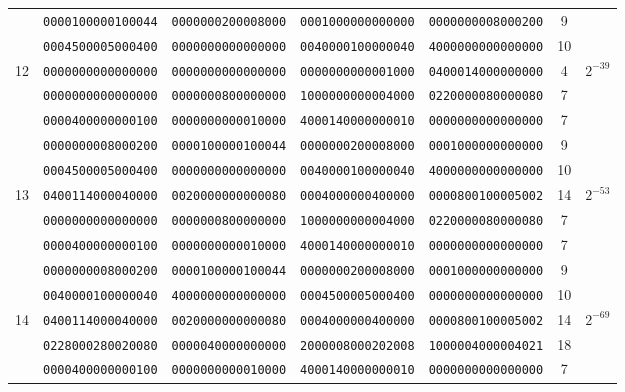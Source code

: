\begin{table}[!tb]
\begin{center}
{\begin{tabular}{ccccccc}
      & {\tt 0000100000100044} & {\tt 0000000200008000} & {\tt 0001000000000000} & {\tt 0000000008000200} & 9  & \\
      & {\tt 0004500005000400} & {\tt 0000000000000000} & {\tt 0040000100000040} & {\tt 4000000000000000} & 10 & \\
12    & {\tt 0000000000000000} & {\tt 0000000000000000} & {\tt 0000000000001000} & {\tt 0400014000000000} & 4  & $2^{-39}$\\
      & {\tt 0000000000000000} & {\tt 0000000800000000} & {\tt 1000000000004000} & {\tt 0220000080000080} & 7  & \\
      & {\tt 0000400000000100} & {\tt 0000000000010000} & {\tt 4000140000000010} & {\tt 0000000000000000} & 7  & \\ \hline

      & {\tt 0000000008000200} & {\tt 0000100000100044} & {\tt 0000000200008000} & {\tt 0001000000000000} & 9  & \\
      & {\tt 0004500005000400} & {\tt 0000000000000000} & {\tt 0040000100000040} & {\tt 4000000000000000} & 10 & \\
13    & {\tt 0400114000040000} & {\tt 0020000000000080} & {\tt 0004000000400000} & {\tt 0000800100005002} & 14 & $2^{-53}$\\
      & {\tt 0000000000000000} & {\tt 0000000800000000} & {\tt 1000000000004000} & {\tt 0220000080000080} & 7  & \\
      & {\tt 0000400000000100} & {\tt 0000000000010000} & {\tt 4000140000000010} & {\tt 0000000000000000} & 7  & \\ \hline

      & {\tt 0000000008000200} & {\tt 0000100000100044} & {\tt 0000000200008000} & {\tt 0001000000000000} & 9  & \\
      & {\tt 0040000100000040} & {\tt 4000000000000000} & {\tt 0004500005000400} & {\tt 0000000000000000} & 10 & \\
14    & {\tt 0400114000040000} & {\tt 0020000000000080} & {\tt 0004000000400000} & {\tt 0000800100005002} & 14 & $2^{-69}$\\
      & {\tt 0228000280020080} & {\tt 0000040000000000} & {\tt 2000008000202008} & {\tt 1000004000004021} & 18 & \\
      & {\tt 0000400000000100} & {\tt 0000000000010000} & {\tt 4000140000000010} & {\tt 0000000000000000} & 7  & \\ \hline


\end{tabular}}
\end{center}
\end{table}

